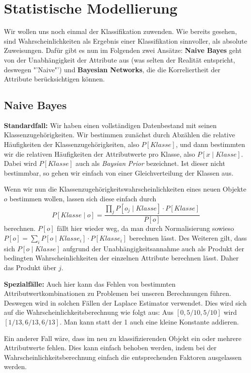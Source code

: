\section{Statistische Modellierung}
Wir wollen uns noch einmal der Klassifikation zuwenden. Wie bereits
gesehen, sind Wahrscheinlichkeiten als Ergebnis einer Klassifikation
sinnvoller, als absolute Zuweisungen. Dafür gibt es nun im Folgenden
zwei Ansätze: \textbf{Naive Bayes} geht von der Unabhängigkeit
der Attribute aus (was selten der Realität entspricht, deswegen "'Naive"')
und \textbf{Bayesian Networks}, die die Korreliertheit der Attribute
berücksichtigen können.

\subsection{Naive Bayes}
\textbf{Standardfall:} Wir haben einen vollständigen Datenbestand 
mit seinen Klassenzugehörigkeiten. Wir bestimmen zunächst durch
Abzählen die relative Häufigkeiten der Klassenzugehörigkeiten, also
\(P[Klasse]\), und dann bestimmten wir die relativen Häufigkeiten
der Attributwerte pro Klasse, also \(P[x \mid Klasse]\). Dabei wird
\(P[Klasse]\) auch als \textit{Baysian Prior} bezeichnet. Ist dieser
nicht bestimmbar, so gehen wir einfach von einer Gleichverteilung der
Klassen aus.

Wenn wir nun die Klassenzugehörigkeitswahrscheinlichkeiten
eines neuen Objekte \(o\)
bestimmen wollen, lassen sich diese einfach durch
\[ P[Klasse \mid o] = \frac{\prod_j P[o_j \mid Klasse] \cdot P[Klasse]}{P[o]}\]
berechnen. \(P[o]\) fällt hier wieder weg, da man durch Normalisierung
sowieso \(P[o] = \sum_i P[o \mid Klasse_i] \cdot P[Klasse_i]\) berechnen
lässt. Des Weiteren gilt, dass sich \(P[o \mid Klasse]\) aufgrund
der Unabhängigkeitsannahme auch als Produkt der bedingten
Wahrscheinlichkeiten der einzelnen Attribute berechnen lässt. Daher das
Produkt über \(j\).

\textbf{Spezialfälle:} Auch hier kann das Fehlen von bestimmten
Attributwertkombinationen zu Problemen bei unseren Berechnungen führen.
Deswegen wird in solchen Fällen der Laplace Estimator verwendet. Dies
wird sich auf die Wahrscheinlichkeitsberechnung wie folgt aus:
Aus \([0, 5/10, 5/10]\) wird \([1/13, 6/13, 6/13]\). Man kann statt der
1 auch eine kleine Konstante addieren.

Ein anderer Fall wäre, dass im neu zu klassifizierenden Objekt
ein oder mehrere Attributwerte fehlen. Dies kann einfach behoben werden,
indem bei der Wahrscheinlichkeitsberechnung einfach die entsprechenden 
Faktoren ausgelassen werden.

